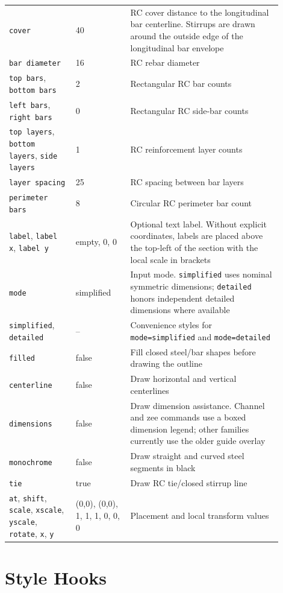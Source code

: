 \documentclass[10pt]{article}
\newcommand{\keyname}[1]{\texttt{#1}}
\begin{document}
\begin{longtable}{p{0.22\linewidth}p{0.18\linewidth}p{0.50\linewidth}}
\keyname{cover} & 40 & RC cover distance to the longitudinal bar centerline. Stirrups are drawn around the outside edge of the longitudinal bar envelope \\
\keyname{bar diameter} & 16 & RC rebar diameter \\
\keyname{top bars}, \keyname{bottom bars} & 2 & Rectangular RC bar counts \\
\keyname{left bars}, \keyname{right bars} & 0 & Rectangular RC side-bar counts \\
\keyname{top layers}, \keyname{bottom layers}, \keyname{side layers} & 1 & RC reinforcement layer counts \\
\keyname{layer spacing} & 25 & RC spacing between bar layers \\
\keyname{perimeter bars} & 8 & Circular RC perimeter bar count \\
\keyname{label}, \keyname{label x}, \keyname{label y} & empty, 0, 0 & Optional text label. Without explicit coordinates, labels are placed above the top-left of the section with the local scale in brackets \\
\keyname{mode} & simplified & Input mode. \keyname{simplified} uses nominal symmetric dimensions; \keyname{detailed} honors independent detailed dimensions where available \\
\keyname{simplified}, \keyname{detailed} & -- & Convenience styles for \keyname{mode=simplified} and \keyname{mode=detailed} \\
\keyname{filled} & false & Fill closed steel/bar shapes before drawing the outline \\
\keyname{centerline} & false & Draw horizontal and vertical centerlines \\
\keyname{dimensions} & false & Draw dimension assistance. Channel and zee commands use a boxed dimension legend; other families currently use the older guide overlay \\
\keyname{monochrome} & false & Draw straight and curved steel segments in black \\
\keyname{tie} & true & Draw RC tie/closed stirrup line \\
\keyname{at}, \keyname{shift}, \keyname{scale}, \keyname{xscale}, \keyname{yscale}, \keyname{rotate}, \keyname{x}, \keyname{y} & (0,0), (0,0), 1, 1, 1, 0, 0, 0 & Placement and local transform values \\
\bottomrule
\end{longtable}

\section{Style Hooks}
\end{document}
